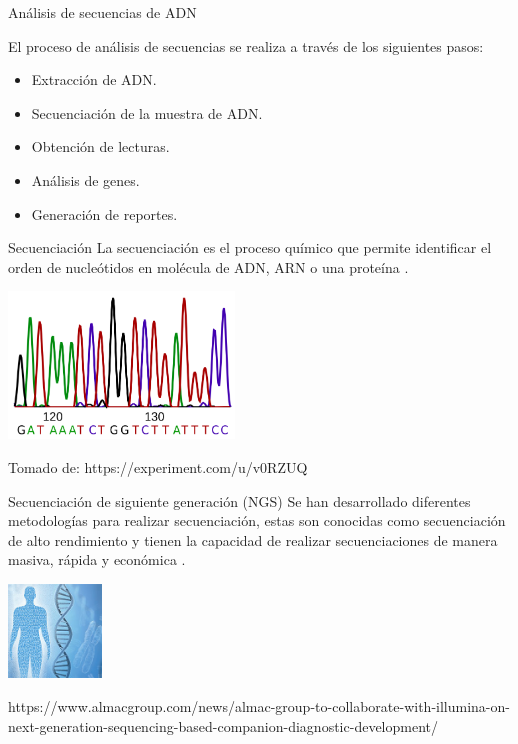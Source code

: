 \documentclass[xcolor=dvipsnames]{beamer}
\begin{document}
\begin{frame}{Análisis de secuencias de ADN}
	
	El proceso de análisis de secuencias se realiza a través de los siguientes pasos:
	
	\begin{itemize}
		\item Extracción de ADN.
		\item Secuenciación de la muestra de ADN.
		\item Obtención de lecturas.
		\item Análisis de genes.
		\item Generación de reportes.
	\end{itemize}
	
\end{frame}

\begin{frame}{Secuenciación}	
	\justifying
	La secuenciación es el proceso químico que permite identificar el orden de nucleótidos en molécula de ADN, ARN o una proteína \cite{Kulski2016}.

	\centering 
	\includegraphics[width=60mm]{secuenciacion}
	
	\hfill \break
	
	\justifying
	\tiny{Tomado de: https://experiment.com/u/v0RZUQ}
\end{frame}

\begin{frame}{Secuenciación de siguiente generación (NGS)}	
	\justifying
	Se han desarrollado diferentes metodologías para realizar secuenciación, estas son conocidas como secuenciación de alto rendimiento y tienen la capacidad de realizar secuenciaciones de manera masiva, rápida y económica  \cite{Kulski2016}. 
	
\hfill \break
	\centering
\includegraphics[width=25mm]{ngs.jpg}

\hfill \break

\justifying
\tiny{https://www.almacgroup.com/news/almac-group-to-collaborate-with-illumina-on-next-generation-sequencing-based-companion-diagnostic-development/}
	
\end{frame}
\end{document}

